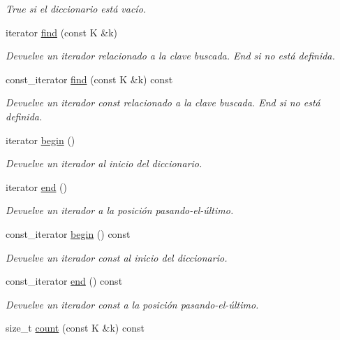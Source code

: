 \begin{DoxyCompactItemize}
\begin{DoxyCompactList}\small\item\em True si el diccionario está vacío. \end{DoxyCompactList}\item 
iterator \hyperlink{classlinear__map_a227924393723570ac58f79fd194aac61}{find} (const K \&k)
\begin{DoxyCompactList}\small\item\em Devuelve un iterador relacionado a la clave buscada. End si no está definida. \end{DoxyCompactList}\item 
const\+\_\+iterator \hyperlink{classlinear__map_a30492a8c9ad1cef02185a9a6ce439114}{find} (const K \&k) const 
\begin{DoxyCompactList}\small\item\em Devuelve un iterador const relacionado a la clave buscada. End si no está definida. \end{DoxyCompactList}\item 
iterator \hyperlink{classlinear__map_a88a219ae647727d1b7e67c2dbe36d972}{begin} ()
\begin{DoxyCompactList}\small\item\em Devuelve un iterador al inicio del diccionario. \end{DoxyCompactList}\item 
iterator \hyperlink{classlinear__map_a29f90bee46581029b6ce496d4ea46683}{end} ()
\begin{DoxyCompactList}\small\item\em Devuelve un iterador a la posición pasando-\/el-\/último. \end{DoxyCompactList}\item 
const\+\_\+iterator \hyperlink{classlinear__map_a583872ffc15171c0d7c3caf307d2d9fe}{begin} () const 
\begin{DoxyCompactList}\small\item\em Devuelve un iterador const al inicio del diccionario. \end{DoxyCompactList}\item 
const\+\_\+iterator \hyperlink{classlinear__map_a0839117b87a8ad0a340df43c942779ad}{end} () const 
\begin{DoxyCompactList}\small\item\em Devuelve un iterador const a la posición pasando-\/el-\/último. \end{DoxyCompactList}\item 
size\+\_\+t \hyperlink{classlinear__map_a99fb7cbd872a6536bcdf00a16255533a}{count} (const K \&k) const 

\end{DoxyCompactItemize}
